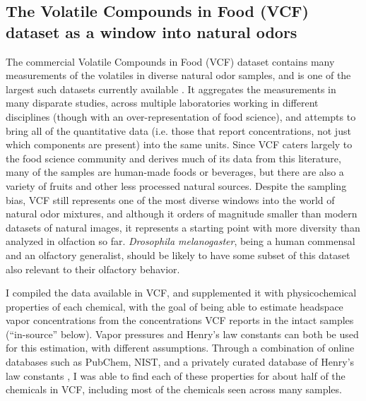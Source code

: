 \documentclass[12pt]{caltech_thesis}
\renewcommand{\cite}{{ }\autocite}
\let\Oldsection\section
\renewcommand{\section}{\FloatBarrier\Oldsection}
\begin{document}
\begin{refsection}
\section{The Volatile Compounds in Food (VCF) dataset as a window into natural odors}
The commercial Volatile Compounds in Food (VCF) dataset contains many measurements of the volatiles in diverse natural odor samples, and is one of the largest such datasets currently available\cite{VCF}.
It aggregates the measurements in many disparate studies, across multiple laboratories working in different disciplines (though with an over-representation of food science), and attempts to bring all of the quantitative data (i.e. those that report concentrations, not just which components are present) into the same units.
Since VCF caters largely to the food science community and derives much of its data from this literature, many of the samples are human-made foods or beverages, but there are also a variety of fruits and other less processed natural sources.
Despite the sampling bias, VCF still represents one of the most diverse windows into the world of natural odor mixtures, and although it orders of magnitude smaller than modern datasets of natural images, it represents a starting point with more diversity than analyzed in olfaction so far.
\textit{Drosophila melanogaster}, being a human commensal and an olfactory generalist, should be likely to have some subset of this dataset also relevant to their olfactory behavior.

I compiled the data available in VCF, and supplemented it with physicochemical properties of each chemical, with the goal of being able to estimate headspace vapor concentrations from the concentrations VCF reports in the intact samples (``in-source'' below).
Vapor pressures and Henry's law constants can both be used for this estimation, with different assumptions.
Through a combination of online databases such as PubChem, NIST, and a privately curated database of Henry's law constants\cite{Pubchem2023,NistWebbook,HenrysLaw}, I was able to find each of these properties for about half of the chemicals in VCF, including most of the chemicals seen across many samples.


\end{refsection}
\end{document}
